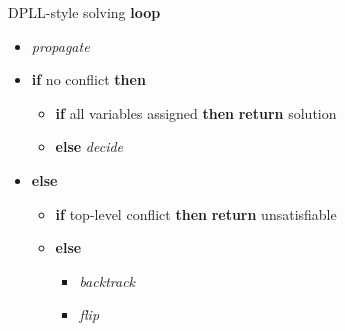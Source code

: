 \begin{frame}{DPLL-style solving}
  \bigskip
  \bigskip
  \textbf{loop}
  \begin{itemize}
  \item [] \textit{propagate}     \hfill{}
  \item [] \textbf{if} no conflict \textbf{then}
    \begin{itemize}\normalsize
    \item [] \textbf{if} all variables assigned
      \textbf{then}
      \textbf{return} solution
    \item [] \textbf{else}
      \textit{decide}
                                  \hfill{}
    \end{itemize}
  \item [] \textbf{else}
    \begin{itemize}\normalsize
    \item [] \textbf{if} top-level conflict
      \textbf{then}
      \textbf{return} unsatisfiable
    \item [] \textbf{else}
      \begin{itemize}\normalsize
      \item [] \textit{backtrack} \hfill{}
      \item [] \textit{flip}      \hfill{}
      \end{itemize}
    \end{itemize}
  \end{itemize}
\end{frame}
%
